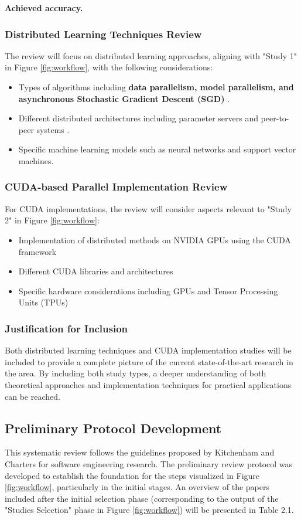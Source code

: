 \textbf{Achieved accuracy.}

\subsubsection{Distributed Learning Techniques Review}
The review will focus on distributed learning approaches, aligning with "Study 1" in Figure
\ref{fig:workflow}, with the following considerations:
\begin{itemize}
	\item Types of algorithms including \textbf{data parallelism, model parallelism, and asynchronous
		      Stochastic Gradient Descent (SGD)} \cite{ben-nun_demystifying_2020,langer_distributed_2020}.
	\item Different distributed architectures including parameter servers and peer-to-peer systems
	      \cite{verbraeken_survey_2021,ben-nun_demystifying_2020,langer_distributed_2020}.
	\item Specific machine learning models such as neural networks and support vector machines.
\end{itemize}

\subsubsection{CUDA-based Parallel Implementation Review}
For CUDA implementations, the review will consider aspects relevant to "Study 2" in Figure
\ref{fig:workflow}:
\begin{itemize}
	\item Implementation of distributed methods on NVIDIA GPUs using the CUDA framework
	\item Different CUDA libraries and architectures
	\item Specific hardware considerations including GPUs and Tensor Processing Units (TPUs)
\end{itemize}

\subsubsection{Justification for Inclusion}
Both distributed learning techniques and CUDA implementation studies will be included to provide a
complete picture of the current state-of-the-art research in the area. By including both study
types, a deeper understanding of both theoretical approaches and implementation techniques for
practical applications can be reached.

\subsection{Preliminary Protocol Development}
This systematic review follows the guidelines proposed by Kitchenham and Charters for software
engineering research. The preliminary review protocol was developed to establish the foundation for
the steps visualized in Figure \ref{fig:workflow}, particularly in the initial stages. An overview
of the papers included after the initial selection phase (corresponding to the output of the
"Studies Selection" phase in Figure \ref{fig:workflow}) will be presented in Table 2.1.

